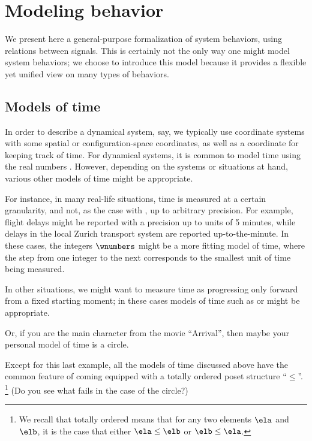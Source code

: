 
\section{Modeling behavior}

We present here a general-purpose formalization of system behaviors, using relations between signals.
This is certainly not the only way one might model system behaviors; we choose to introduce this model because it provides a flexible yet unified view on many types of behaviors.

\subsection{Models of time}

In order to describe a dynamical system, say, we typically use coordinate systems with some spatial or configuration-space coordinates, as well as a coordinate for keeping track of time.
For dynamical systems, it is common to model time using the real numbers \reals.
However, depending on the systems or situations at hand, various other models of time might be appropriate.

For instance, in many real-life situations, time is measured at a certain granularity, and not, as the case with \reals, up to arbitrary precision.
For example, flight delays might be reported with a precision up to units of 5 minutes, while delays in the local Zurich transport system are reported up-to-the-minute.
In these cases, the integers $\wnumbers$ might be a more fitting model of time, where the step from one integer to the next corresponds to the smallest unit of time being measured.

In other situations, we might want to measure time as progressing only forward from a fixed starting moment; in these cases models of time such as \nonNegReals  or \natnumbers  might be appropriate.

Or, if you are the main character from the movie ``Arrival'', then maybe your personal model of time is a circle.


Except for this last example, all the models of time discussed above have the common feature of coming equipped with a totally ordered poset structure ``$\leq$''.
\footnote{We recall that totally ordered means that for any two elements $\ela$ and $\elb$, it is the case that either $\ela \leq \elb$ or $\elb \leq \ela$.}  (Do you see what fails in the case of the circle?)

